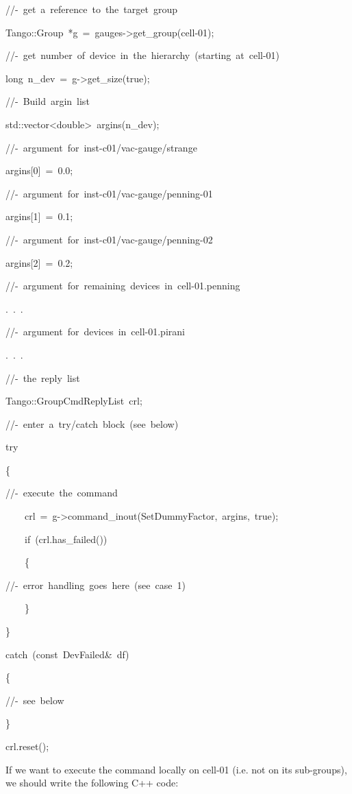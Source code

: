 
\begin{lyxcode}
//-~get~a~reference~to~the~target~group

Tango::Group~{*}g~=~gauges->get\_group(\textquotedbl{}cell-01\textquotedbl{});

//-~get~number~of~device~in~the~hierarchy~(starting~at~cell-01)

long~n\_dev~=~g->get\_size(true);

//-~Build~argin~list

std::vector<double>~argins(n\_dev);

//-~argument~for~inst-c01/vac-gauge/strange

argins{[}0{]}~=~0.0;

//-~argument~for~inst-c01/vac-gauge/penning-01

argins{[}1{]}~=~0.1;

//-~argument~for~inst-c01/vac-gauge/penning-02

argins{[}2{]}~=~0.2;

//-~argument~for~remaining~devices~in~cell-01.penning

.~.~.

//-~argument~for~devices~in~cell-01.pirani

.~.~.

//-~the~reply~list

Tango::GroupCmdReplyList~crl;

//-~enter~a~try/catch~block~(see~below)

try

\{

//-~execute~the~command

~~~~crl~=~g->command\_inout(\textquotedbl{}SetDummyFactor\textquotedbl{},~argins,~true);

~~~~if~(crl.has\_failed())

~~~~\{

//-~error~handling~goes~here~(see~case~1)

~~~~\}

\}

catch~(const~DevFailed\&~df)

\{

//-~see~below

\}

crl.reset();
\end{lyxcode}


If we want to execute the command locally on \textquotedbl{}cell-01\textquotedbl{}
(i.e. not on its sub-groups), we should write the following C++ code:

